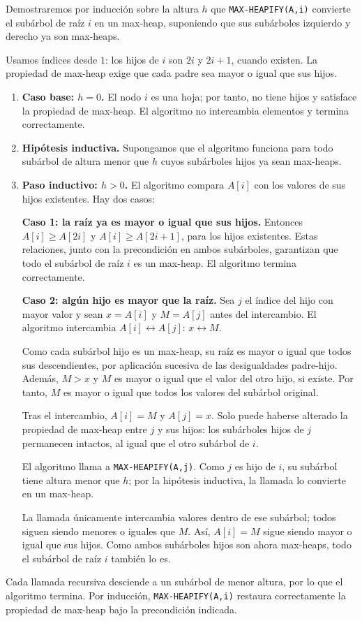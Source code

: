 
Demostraremos por inducción sobre la altura $h$ que \texttt{MAX-HEAPIFY(A,i)} convierte el subárbol de raíz $i$ en un max-heap, suponiendo que sus subárboles izquierdo y derecho ya son max-heaps.

Usamos índices desde $1$: los hijos de $i$ son $2i$ y $2i+1$, cuando existen. La propiedad de max-heap exige que cada padre sea mayor o igual que sus hijos.

\begin{enumerate}
\item \textbf{Caso base: $h=0$.} El nodo $i$ es una hoja; por tanto, no tiene hijos y satisface la propiedad de max-heap. El algoritmo no intercambia elementos y termina correctamente.

\item \textbf{Hipótesis inductiva.} Supongamos que el algoritmo funciona para todo subárbol de altura menor que $h$ cuyos subárboles hijos ya sean max-heaps.

\item \textbf{Paso inductivo: $h>0$.} El algoritmo compara $A[i]$ con los valores de sus hijos existentes. Hay dos casos:

\textbf{Caso 1: la raíz ya es mayor o igual que sus hijos.} Entonces $A[i]\ge A[2i]$ y $A[i]\ge A[2i+1]$, para los hijos existentes. Estas relaciones, junto con la precondición en ambos subárboles, garantizan que todo el subárbol de raíz $i$ es un max-heap. El algoritmo termina correctamente.

\textbf{Caso 2: algún hijo es mayor que la raíz.} Sea $j$ el índice del hijo con mayor valor y sean $x=A[i]$ y $M=A[j]$ antes del intercambio. El algoritmo intercambia $A[i]\leftrightarrow A[j]$: $x\leftrightarrow M$.

Como cada subárbol hijo es un max-heap, su raíz es mayor o igual que todos sus descendientes, por aplicación sucesiva de las desigualdades padre-hijo. Además, $M>x$ y $M$ es mayor o igual que el valor del otro hijo, si existe. Por tanto, $M$ es mayor o igual que todos los valores del subárbol original.

Tras el intercambio, $A[i]=M$ y $A[j]=x$. Solo puede haberse alterado la propiedad de max-heap entre $j$ y sus hijos: los subárboles hijos de $j$ permanecen intactos, al igual que el otro subárbol de $i$.

El algoritmo llama a \texttt{MAX-HEAPIFY(A,j)}. Como $j$ es hijo de $i$, su subárbol tiene altura menor que $h$; por la hipótesis inductiva, la llamada lo convierte en un max-heap.

La llamada únicamente intercambia valores dentro de ese subárbol; todos siguen siendo menores o iguales que $M$. Así, $A[i]=M$ sigue siendo mayor o igual que sus hijos. Como ambos subárboles hijos son ahora max-heaps, todo el subárbol de raíz $i$ también lo es.
\end{enumerate}

Cada llamada recursiva desciende a un subárbol de menor altura, por lo que el algoritmo termina. Por inducción, \texttt{MAX-HEAPIFY(A,i)} restaura correctamente la propiedad de max-heap bajo la precondición indicada.
\fin
